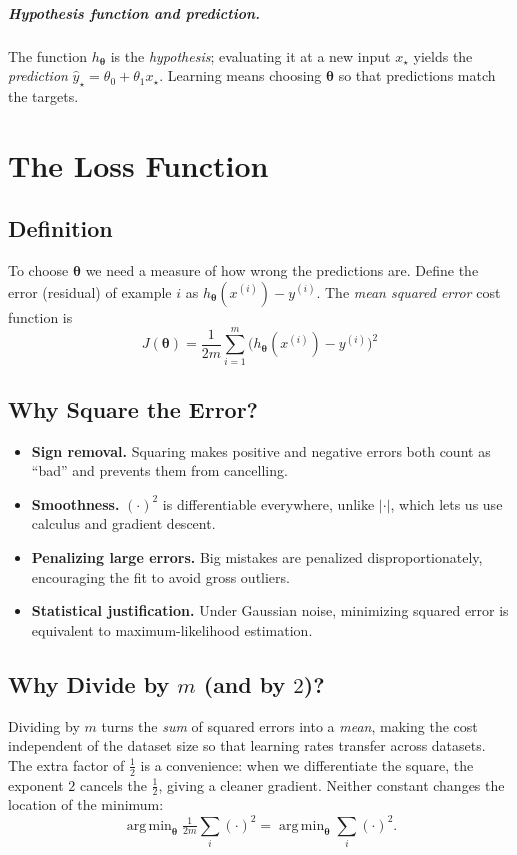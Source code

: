 \documentclass[11pt,a4paper]{report}
\theoremstyle{definition}
\theoremstyle{plain}
\theoremstyle{remark}
\newcommand{\vw}{\bm{\theta}}          %
\newcommand{\htheta}{h_{\bm{\theta}}}
\DeclareMathOperator*{\argmin}{arg\,min}
\begin{document}
	\paragraph{Hypothesis function and prediction.}
	The function $\htheta$ is the \emph{hypothesis}; evaluating it at a new input
	$x_\star$ yields the \emph{prediction} $\hat y_\star=\theta_0+\theta_1 x_\star$.
	Learning means choosing $\vw$ so that predictions match the targets.
	
	\chapter{The Loss Function}
	
	\section{Definition}
	To choose $\vw$ we need a measure of how wrong the predictions are. Define the
	error (residual) of example $i$ as $\htheta(x^{(i)})-y^{(i)}$. The \emph{mean
		squared error} cost function is
	\begin{equation}
		\boxed{\;J(\vw)=\frac{1}{2m}\sum_{i=1}^{m}\bigl(\htheta(x^{(i)})-y^{(i)}\bigr)^2\;}
		\label{eq:cost}
	\end{equation}
	
	\section{Why Square the Error?}
	\begin{itemize}[nosep]
		\item \textbf{Sign removal.} Squaring makes positive and negative errors both
		count as ``bad'' and prevents them from cancelling.
		\item \textbf{Smoothness.} $(\cdot)^2$ is differentiable everywhere, unlike
		$|\cdot|$, which lets us use calculus and gradient descent.
		\item \textbf{Penalizing large errors.} Big mistakes are penalized
		disproportionately, encouraging the fit to avoid gross outliers.
		\item \textbf{Statistical justification.} Under Gaussian noise, minimizing
		squared error is equivalent to maximum-likelihood estimation.
	\end{itemize}
	
	\section{Why Divide by $m$ (and by $2$)?}
	Dividing by $m$ turns the \emph{sum} of squared errors into a \emph{mean},
	making the cost independent of the dataset size so that learning rates transfer
	across datasets. The extra factor of $\tfrac12$ is a convenience: when we
	differentiate the square, the exponent $2$ cancels the $\tfrac12$, giving a
	cleaner gradient. Neither constant changes the location of the minimum:
	\[
	\argmin_{\vw} \tfrac{1}{2m}\textstyle\sum_i(\cdot)^2
	= \argmin_{\vw} \sum_i(\cdot)^2 .
	\]
	
\end{document}
